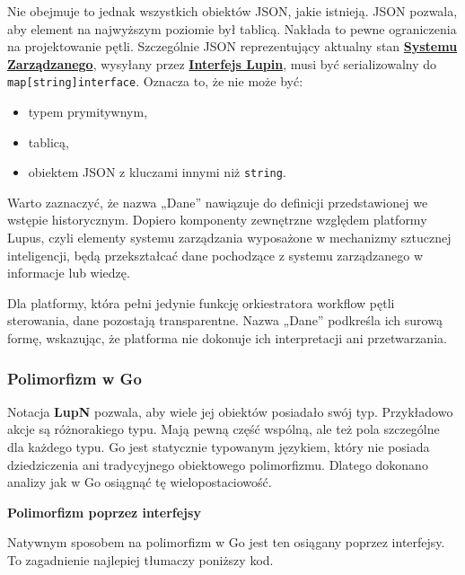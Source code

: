 Nie obejmuje to jednak wszystkich obiektów JSON, jakie istnieją. JSON pozwala, aby element na najwyższym poziomie był tablicą. Nakłada to pewne ograniczenia na projektowanie pętli. Szczególnie JSON reprezentujący aktualny stan \hyperlink{def:system-zarzadzany}{\textbf{Systemu Zarządzanego}}, wysyłany przez \hyperlink{def:interfejs-lupin}{\textbf{Interfejs Lupin}}, musi być serializowalny do \texttt{map[string]interface{}}. Oznacza to, że nie może być:
\begin{itemize}
    \item typem prymitywnym,
    \item tablicą,
    \item obiektem JSON z kluczami innymi niż \texttt{string}.
\end{itemize}

Warto zaznaczyć, że nazwa „Dane” nawiązuje do definicji przedstawionej we wstępie historycznym. Dopiero komponenty zewnętrzne względem platformy Lupus, czyli elementy systemu zarządzania wyposażone w mechanizmy sztucznej inteligencji, będą przekształcać dane pochodzące z systemu zarządzanego w informacje lub wiedzę.

Dla platformy, która pełni jedynie funkcję orkiestratora workflow pętli sterowania, dane pozostają transparentne. Nazwa „Dane” podkreśla ich surową formę, wskazując, że platforma nie dokonuje ich interpretacji ani przetwarzania.

\subsubsection{Polimorfizm w Go}

Notacja \textbf{LupN} pozwala, aby wiele jej obiektów posiadało swój typ. Przykładowo akcje są różnorakiego typu. Mają pewną część wspólną, ale też pola szczególne dla każdego typu. Go jest statycznie typowanym językiem, który nie posiada dziedziczenia ani tradycyjnego obiektowego polimorfizmu. Dlatego dokonano analizy jak w Go osiągnąć tę wielopostaciowość.

\textbf{Polimorfizm poprzez interfejsy}

Natywnym sposobem na polimorfizm w Go jest ten osiągany poprzez interfejsy. To zagadnienie najlepiej tłumaczy poniższy kod.


